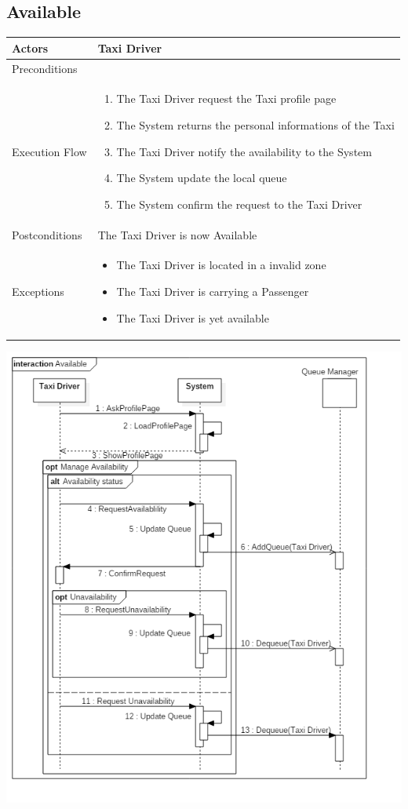 \documentclass[english]{article}
\begin{document}
\subsection{Available}

\begin{tabular}{lp{8cm}}
\hline
Actors & Taxi Driver \\
\hline
Preconditions & \\
\hline
Execution Flow &  
		\begin{enumerate}
			\item The Taxi Driver request the Taxi profile page
			\item The System returns the personal informations of the Taxi
			\item The Taxi Driver notify the availability to the System
			\item The System update the local queue
			\item The System confirm the request to the Taxi Driver
		\end{enumerate} 
	\\ 
\hline
Postconditions & The Taxi Driver is now Available \\
\hline
Exceptions & 
	\begin{itemize} 
		\item The Taxi Driver is located in a invalid zone
		\item The Taxi Driver is carrying a Passenger
		\item The Taxi Driver is yet available
	\end{itemize}
\end{tabular}

\includegraphics[width=\textwidth]{Available}
\end{document}
